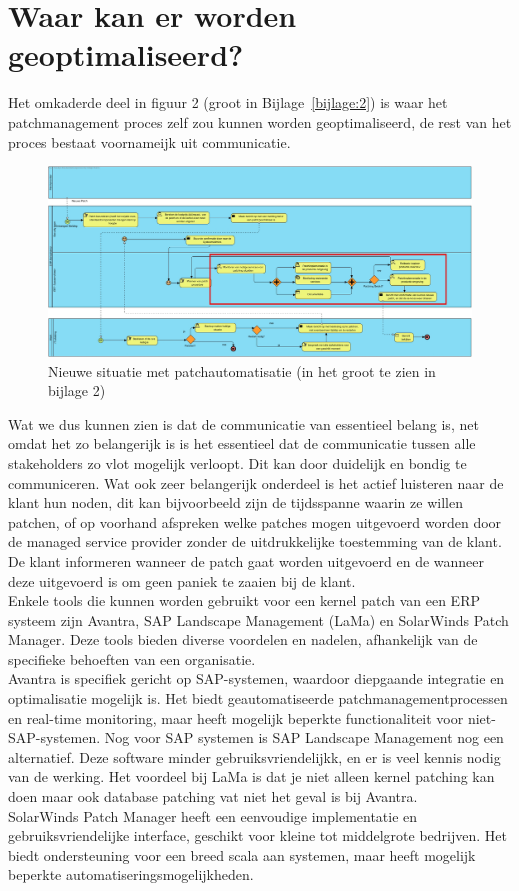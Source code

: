 \section{Waar kan er worden geoptimaliseerd?}

Het omkaderde deel in figuur 2 (groot in Bijlage~\ref{bijlage:2}) is waar het patchmanagement proces zelf zou kunnen worden geoptimaliseerd, de rest van het proces bestaat voornameijk uit communicatie.
 \begin{figure}[htbp]
    \centering
    \includegraphics[width=\textwidth]{huidigesituatie2.png}
    \caption{Nieuwe situatie met patchautomatisatie (in het groot te zien in bijlage 2)}
     \label{fig:huidigesituatie2}
\end{figure}

Wat we dus kunnen zien is dat de communicatie van essentieel belang is, net omdat het zo belangerijk is is het essentieel dat de communicatie tussen alle stakeholders zo vlot mogelijk verloopt. Dit kan door duidelijk en bondig te communiceren. Wat ook zeer belangerijk onderdeel is het actief luisteren naar de klant hun noden, dit kan bijvoorbeeld zijn de tijdsspanne waarin ze willen patchen, of op voorhand afspreken
 welke patches mogen uitgevoerd worden door de managed service provider zonder de uitdrukkelijke toestemming van de klant. De klant informeren wanneer de patch gaat worden uitgevoerd en de wanneer deze uitgevoerd is om geen paniek te zaaien bij de klant.\\

Enkele tools die kunnen worden gebruikt voor een kernel patch van een ERP systeem zijn Avantra, SAP Landscape Management (LaMa) en SolarWinds Patch Manager. Deze tools bieden diverse voordelen en nadelen, afhankelijk van de specifieke behoeften van een organisatie. \\
 Avantra is specifiek gericht op SAP-systemen, waardoor diepgaande integratie en optimalisatie mogelijk is. Het biedt geautomatiseerde patchmanagementprocessen en real-time monitoring, maar heeft 
 mogelijk beperkte functionaliteit voor niet-SAP-systemen. Nog voor SAP systemen is SAP Landscape Management nog een alternatief. Deze software minder gebruiksvriendelijkk, en er is veel kennis nodig van de werking. Het voordeel 
 bij LaMa is dat je niet alleen kernel patching kan doen maar ook database patching vat niet het geval is bij Avantra. \\
 SolarWinds Patch Manager heeft een eenvoudige implementatie en gebruiksvriendelijke interface, geschikt voor kleine tot middelgrote bedrijven. Het biedt ondersteuning voor een breed scala aan 
 systemen, maar heeft mogelijk beperkte automatiseringsmogelijkheden. \\


